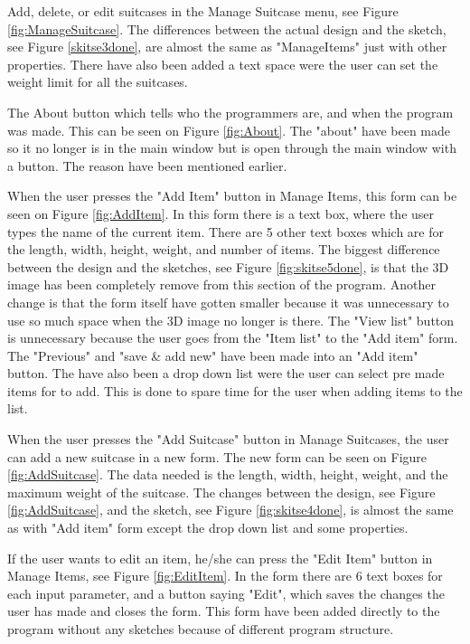 Add, delete, or edit suitcases in the Manage Suitcase menu, see Figure \ref{fig:ManageSuitcase}. The differences between the actual design and the sketch, see Figure \ref{skitse3done}, are almost the same as "ManageItems" just with other properties. There have also been added a text space were the user can set the weight limit for all the suitcases.

The About button which tells who the programmers are, and when the program was made. This can be seen on Figure \ref{fig:About}. The "about" have been made so it no longer is in the main window but is open through the main window with a button. The reason have been mentioned earlier.

When the user presses the "Add Item" button in Manage Items, this form can be seen on Figure \ref{fig:AddItem}. In this form there is a text box, where the user types the name of the current item. There are 5 other text boxes which are for the length, width, height, weight, and number of items. The biggest difference between the design and the sketches, see Figure \ref{fig:skitse5done}, is that the 3D image has been completely remove from this section of the program. Another change is that the form itself have gotten smaller because it was unnecessary to use so much space when the 3D image no longer is there. The "View list" button is unnecessary because the user goes from the "Item list" to the "Add item" form. The "Previous" and "save \& add new" have been made into an "Add item" button. The have also been a drop down list were the user can select pre made items for to add. This is done to spare time for the user when adding items to the list.

When the user presses the "Add Suitcase" button in Manage Suitcases, the user can add a new suitcase in a new form. The new form can be seen on Figure \ref{fig:AddSuitcase}. The data needed is the length, width, height, weight, and the maximum weight of the suitcase. The changes between the design, see Figure \ref{fig:AddSuitcase}, and the sketch, see Figure \ref{fig:skitse4done}, is almost the same as with "Add item" form except the drop down list and some properties.

If the user wants to edit an item, he/she can press the "Edit Item" button in Manage Items, see Figure \ref{fig:EditItem}. In the form there are 6 text boxes for each input parameter, and a button saying "Edit", which saves the changes the user has made and closes the form. This form have been added directly to the program without any sketches because of different program structure.


